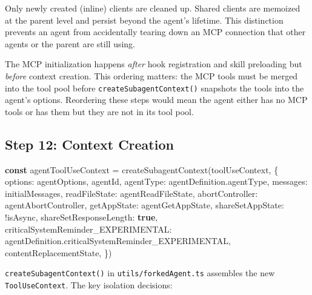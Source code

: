 \documentclass[
  english,
  11pt,
  letterpaper,
]{book}
\newenvironment{Shaded}{\begin{snugshade}}{\end{snugshade}}
\newcommand{\AttributeTok}[1]{\textcolor[rgb]{0.40,0.45,0.13}{#1}}
\newcommand{\FunctionTok}[1]{\textcolor[rgb]{0.28,0.35,0.67}{#1}}
\newcommand{\KeywordTok}[1]{\textcolor[rgb]{0.00,0.23,0.31}{\textbf{#1}}}
\newcommand{\NormalTok}[1]{\textcolor[rgb]{0.00,0.23,0.31}{#1}}
\newcommand{\OperatorTok}[1]{\textcolor[rgb]{0.37,0.37,0.37}{#1}}
\begin{document}
Only newly created (inline) clients are cleaned up. Shared clients are
memoized at the parent level and persist beyond the agent's lifetime.
This distinction prevents an agent from accidentally tearing down an MCP
connection that other agents or the parent are still using.

The MCP initialization happens \emph{after} hook registration and skill
preloading but \emph{before} context creation. This ordering matters:
the MCP tools must be merged into the tool pool before
\texttt{createSubagentContext()} snapshots the tools into the agent's
options. Reordering these steps would mean the agent either has no MCP
tools or has them but they are not in its tool pool.

\subsection{Step 12: Context Creation}\label{step-12-context-creation}

\begin{Shaded}
\begin{Highlighting}[]
\KeywordTok{const}\NormalTok{ agentToolUseContext }\OperatorTok{=} \FunctionTok{createSubagentContext}\NormalTok{(toolUseContext}\OperatorTok{,}\NormalTok{ \{}
\NormalTok{  options}\OperatorTok{:}\NormalTok{ agentOptions}\OperatorTok{,}
\NormalTok{  agentId}\OperatorTok{,}
\NormalTok{  agentType}\OperatorTok{:}\NormalTok{ agentDefinition}\OperatorTok{.}\AttributeTok{agentType}\OperatorTok{,}
\NormalTok{  messages}\OperatorTok{:}\NormalTok{ initialMessages}\OperatorTok{,}
\NormalTok{  readFileState}\OperatorTok{:}\NormalTok{ agentReadFileState}\OperatorTok{,}
\NormalTok{  abortController}\OperatorTok{:}\NormalTok{ agentAbortController}\OperatorTok{,}
\NormalTok{  getAppState}\OperatorTok{:}\NormalTok{ agentGetAppState}\OperatorTok{,}
\NormalTok{  shareSetAppState}\OperatorTok{:} \OperatorTok{!}\NormalTok{isAsync}\OperatorTok{,}
\NormalTok{  shareSetResponseLength}\OperatorTok{:} \KeywordTok{true}\OperatorTok{,}
\NormalTok{  criticalSystemReminder\_EXPERIMENTAL}\OperatorTok{:}
\NormalTok{    agentDefinition}\OperatorTok{.}\AttributeTok{criticalSystemReminder\_EXPERIMENTAL}\OperatorTok{,}
\NormalTok{  contentReplacementState}\OperatorTok{,}
\NormalTok{\})}
\end{Highlighting}
\end{Shaded}

\texttt{createSubagentContext()} in \texttt{utils/forkedAgent.ts}
assembles the new \texttt{ToolUseContext}. The key isolation decisions:
\end{document}
